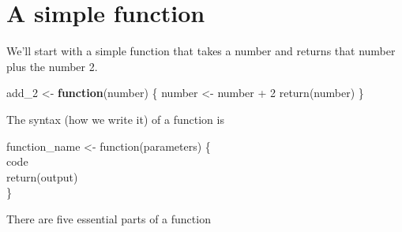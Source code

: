 \documentclass[
  a4paper,
]{krantz}
\makeatletter
\newenvironment{Shaded}{\begin{snugshade}}{\end{snugshade}}
\newcommand{\ControlFlowTok}[1]{\textcolor[rgb]{0.13,0.29,0.53}{\textbf{#1}}}
\newcommand{\DecValTok}[1]{\textcolor[rgb]{0.00,0.00,0.81}{#1}}
\newcommand{\FunctionTok}[1]{\textcolor[rgb]{0.00,0.00,0.00}{#1}}
\newcommand{\NormalTok}[1]{#1}
\newcommand{\OtherTok}[1]{\textcolor[rgb]{0.56,0.35,0.01}{#1}}
\newcommand{\SpecialCharTok}[1]{\textcolor[rgb]{0.00,0.00,0.00}{#1}}
\newenvironment{kframe}{%
\medskip{}
\setlength{\fboxsep}{.8em}
 \def\at@end@of@kframe{}%
 \ifinner\ifhmode%
  \def\at@end@of@kframe{\end{minipage}}%
  \begin{minipage}{\columnwidth}%
 \fi\fi%
 \def\FrameCommand##1{\hskip\@totalleftmargin \hskip-\fboxsep
 \colorbox{shadecolor}{##1}\hskip-\fboxsep
     \hskip-\linewidth \hskip-\@totalleftmargin \hskip\columnwidth}%
 \MakeFramed {\advance\hsize-\width
   \@totalleftmargin\z@ \linewidth\hsize
   \@setminipage}}%
 {\par\unskip\endMakeFramed%
 \at@end@of@kframe}
\renewenvironment{Shaded}{\begin{kframe}}{\end{kframe}}
\makeatother
\begin{document}
\hypertarget{a-simple-function}{%
\section{A simple function}\label{a-simple-function}}

We'll start with a simple function that takes a number and
returns that number plus the number 2.

\begin{Shaded}
\begin{Highlighting}[]
\NormalTok{add\_2 }\OtherTok{\textless{}{-}} \ControlFlowTok{function}\NormalTok{(number) \{}
\NormalTok{  number }\OtherTok{\textless{}{-}}\NormalTok{ number }\SpecialCharTok{+} \DecValTok{2}
  \FunctionTok{return}\NormalTok{(number)}
\NormalTok{\}}
\end{Highlighting}
\end{Shaded}

The syntax (how we write it) of a function is

function\_name \textless- function(parameters) \{\\
code\\
return(output)\\
\}

There are five essential parts of a function
\end{document}
